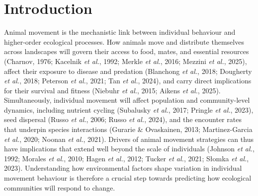 \documentclass[
  12pt,
]{article}
\begin{document}
\section{Introduction}\label{introduction}

\noindent Animal movement is the mechanistic link between individual behaviour and higher-order ecological processes. How animals move and distribute themselves across landscapes will govern their access to food, mates, and essential resources (Charnov, 1976; Kacelnik \emph{et al.}, 1992; Merkle \emph{et al.}, 2016; Mezzini \emph{et al.}, 2025), affect their exposure to disease and predation (Blanchong \emph{et al.}, 2018; Dougherty \emph{et al.}, 2018; Peterson \emph{et al.}, 2021; Tan \emph{et al.}, 2024), and carry direct implications for their survival and fitness (Niebuhr \emph{et al.}, 2015; Aikens \emph{et al.}, 2025). Simultaneously, individual movement will affect population and community-level dynamics, including nutrient cycling (Subalusky \emph{et al.}, 2017; {Pringle \emph{et al.}}, 2023), seed dispersal (Russo \emph{et al.}, 2006; Russo \emph{et al.}, 2024), and the encounter rates that underpin species interactions (Gurarie \& Ovaskainen, 2013; Martinez-Garcia \emph{et al.}, 2020; {Noonan \emph{et al.}}, 2021). Drivers of animal movement strategies can thus have implications that extend well beyond the scale of individuals (Johnson \emph{et al.}, 1992; Morales \emph{et al.}, 2010; {Hagen \emph{et al.}}, 2012; Tucker \emph{et al.}, 2021; Słomka \emph{et al.}, 2023). Understanding how environmental factors shape variation in individual movement behaviour is therefore a crucial step towards predicting how ecological communities will respond to change.
\end{document}
